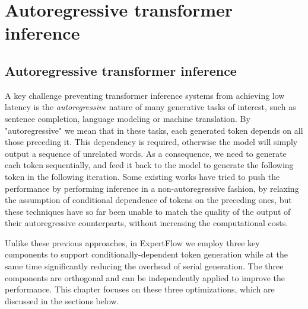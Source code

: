 
\chapter{Autoregressive transformer inference}\label{chapter-5}


\section{Autoregressive transformer inference}\label{autoregressive-characterization}

A key challenge preventing transformer inference systems from achieving low latency is the \textit{autoregressive} nature of many generative tasks of interest, such as sentence completion, language modeling or machine translation. By "autoregressive" we mean that in these tasks, each generated token depends on all those preceding it. This dependency is required, otherwise the model will simply output a sequence of unrelated words. As a consequence, we need to generate each token sequentially, and feed it back to the model to generate the following token in the following iteration. Some existing works have tried to push the performance by performing inference in a non-autoregressive fashion, by relaxing the assumption of conditional dependence of tokens on the preceding ones, but these techniques have so far been unable to match the quality of the output of their autoregressive counterparts, without increasing the computational costs.  

Unlike these previous approaches, in ExpertFlow we employ three key components to support conditionally-dependent token generation while at the same time significantly reducing the overhead of serial generation. The three components are orthogonal and can be independently applied to improve the performance. This chapter focuses on these three optimizations, which are discussed in the sections below.

